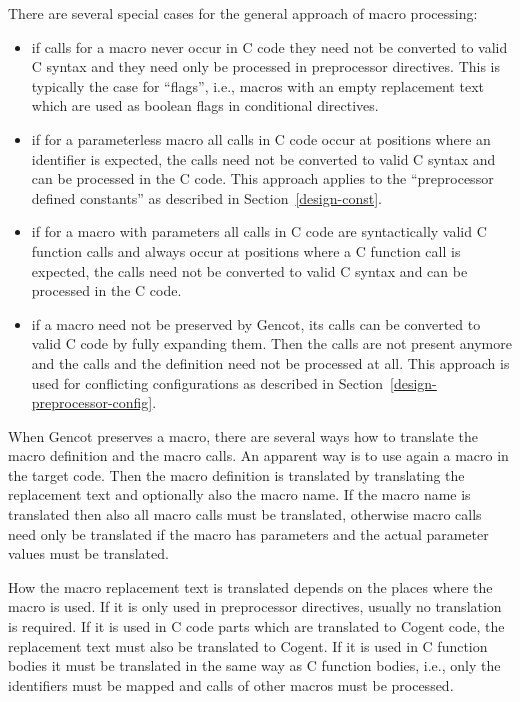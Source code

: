 There are several special cases for the general approach of macro processing:
\begin{itemize}
\item if calls for a macro never occur in C code they need not be converted to valid C syntax and they need
only be processed in preprocessor directives. This is typically the case for ``flags'', i.e., macros with
an empty replacement text which are used as boolean flags in conditional directives.
\item if for a parameterless macro all calls in C code occur at positions where an identifier is expected,
the calls need not be converted to valid C syntax and can be processed in the C code. This approach applies
to the ``preprocessor defined constants'' as described in Section~\ref{design-const}. 
\item if for a macro with parameters all calls in C code are syntactically valid C function calls and
always occur at positions where a C function call is expected, the calls need not be converted to valid C 
syntax and can be processed in the C code.
\item if a macro need not be preserved by Gencot, its calls can be converted to valid C code by fully expanding
them. Then the calls are not present anymore and the calls and the definition need not be processed at all.
This approach is used for conflicting configurations as described in Section~\ref{design-preprocessor-config}.
\end{itemize}

When Gencot preserves a macro, there are several ways how to translate the macro definition and the macro calls.
An apparent way is to use again a macro in the target code. Then the macro definition is translated by translating
the replacement text and optionally also the macro name. If the macro name is translated then also all macro calls
must be translated, otherwise macro calls need only be translated if the macro has parameters and the actual 
parameter values must be translated.

How the macro replacement text is translated depends on the places where the macro is used. If it is only used 
in preprocessor directives, usually no translation is required. If it is used in C code parts which are translated to
Cogent code, the replacement text must also be translated to Cogent. If it is used in C function bodies it must
be translated in the same way as C function bodies, i.e., only the identifiers must be mapped and calls of other
macros must be processed.

